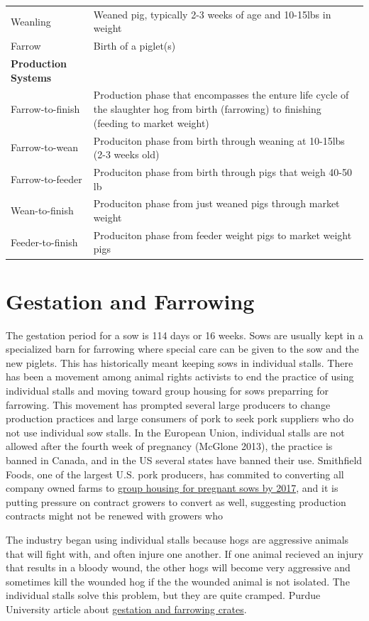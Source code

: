 \documentclass[
  letterpaper,
  DIV=11,
  numbers=noendperiod]{scrreprt}
\begin{document}
\begin{longtable}[]{@{}
  >{\raggedright\arraybackslash}p{}
  >{\raggedright\arraybackslash}p{}@{}}
Weanling & Weaned pig, typically 2-3 weeks of age and 10-15lbs in
weight \\
Farrow & Birth of a piglet(s) \\
\textbf{Production Systems} & \\
Farrow-to-finish & Production phase that encompasses the enture life
cycle of the slaughter hog from birth (farrowing) to finishing (feeding
to market weight) \\
Farrow-to-wean & Produciton phase from birth through weaning at 10-15lbs
(2-3 weeks old) \\
Farrow-to-feeder & Produciton phase from birth through pigs that weigh
40-50 lb \\
Wean-to-finish & Produciton phase from just weaned pigs through market
weight \\
Feeder-to-finish & Produciton phase from feeder weight pigs to market
weight pigs \\
\end{longtable}

\section{Gestation and Farrowing}\label{gestation-and-farrowing}

The gestation period for a sow is 114 days or 16 weeks. Sows are usually
kept in a specialized barn for farrowing where special care can be given
to the sow and the new piglets. This has historically meant keeping sows
in individual stalls. There has been a movement among animal rights
activists to end the practice of using individual stalls and moving
toward group housing for sows preparring for farrowing. This movement
has prompted several large producers to change production practices and
large consumers of pork to seek pork suppliers who do not use individual
sow stalls. In the European Union, individual stalls are not allowed
after the fourth week of pregnancy (McGlone 2013), the practice is
banned in Canada, and in the US several states have banned their use.
Smithfield Foods, one of the largest U.S. pork producers, has commited
to converting all company owned farms to
\href{pdf-Readings/smithfield-2014report.pdf}{group housing for pregnant
sows by 2017}, and it is putting pressure on contract growers to convert
as well, suggesting production contracts might not be renewed with
growers who

The industry began using individual stalls because hogs are aggressive
animals that will fight with, and often injure one another. If one
animal recieved an injury that results in a bloody wound, the other hogs
will become very aggressive and sometimes kill the wounded hog if the
the wounded animal is not isolated. The individual stalls solve this
problem, but they are quite cramped. Purdue University article about
\href{http://www.ansc.purdue.edu/faen/gest\%20crates.html}{gestation and
farrowing crates}.
\end{document}
